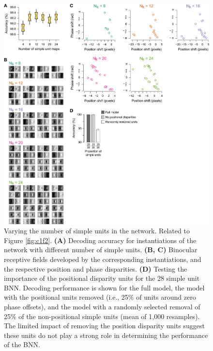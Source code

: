 \begin{figure}[!h]
  \centering
  \includegraphics[width=14cm,keepaspectratio]{FigS2.png}
  \caption[Varying the number of simple units in the network.]{Varying the number of simple units in the network. Related to Figure \ref{fig:c1f2}. \textbf{(A)} Decoding accuracy for instantiations of the network with different number of simple units. \textbf{(B, C)} Binocular receptive fields developed by the corresponding instantiations, and the respective position and phase disparities. \textbf{(D)} Testing the importance of the positional disparity units for the 28 simple unit BNN. Decoding performance is shown for the full model, the model with the positional units removed (i.e., 25\% of units around zero phase offsets), and the model with a randomly selected removal of 25\% of the non-positional simple units (mean of 1,000 resamples). The limited impact of removing the position disparity units suggest these units do not play a strong role in determining the performance of the BNN.}
  \label{fig:c1fs2}
\end{figure}




